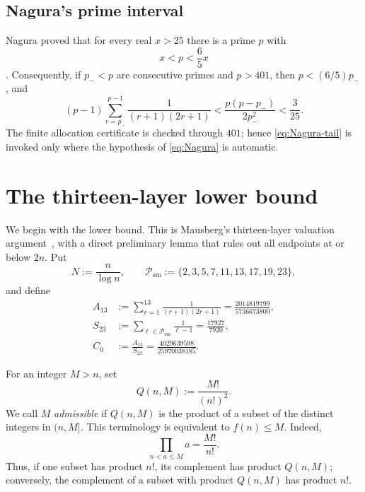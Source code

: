 \documentclass[11pt]{article}
\numberwithin{equation}{section}
\theoremstyle{definition}
\theoremstyle{remark}
\newcommand{\1}{\mathbf 1}
\begin{document}
\subsection{Nagura's prime interval}
\label{subsec:Nagura}

Nagura proved that for every real \(x>25\) there is a prime \(p\) with
\begin{equation}
 \label{eq:Nagura}
                         x<p<\frac65x
\end{equation}
\cite{Nagura1952}.  Consequently, if \(p_-<p\) are consecutive primes and
\(p>401\), then \(p<(6/5)p_-\), and
\begin{equation}
 \label{eq:Nagura-tail}
 (p-1)\sum_{r=p_-}^{p-1}
       \frac1{(r+1)(2r+1)}
 <\frac{p(p-p_-)}{2p_-^2}<\frac3{25}.
\end{equation}
The finite allocation certificate is checked through \(401\); hence
\eqref{eq:Nagura-tail} is invoked only where the hypothesis of
\eqref{eq:Nagura} is automatic.
 \section{The thirteen-layer lower bound}
\label{sec:lower-bound}

We begin with the lower bound.  This is Mausberg's thirteen-layer
valuation argument~\cite{Mausberg2026}, with a direct preliminary lemma
that rules out all endpoints at or below \(2n\).  Put
\[
        N:=\frac{n}{\log n},
        \qquad
        \mathcal P_{\mathrm{sm}}
        :=\{2,3,5,7,11,13,17,19,23\},
\]
and define
\begin{equation}
 \begin{split}
 A_{13}
   &:=\sum_{r=1}^{13}\frac{1}{(r+1)(2r+1)}
     =\frac{2014819799}{5736673800},\\
 S_{23}
   &:=\sum_{\ell\in\mathcal P_{\mathrm{sm}}}
               \frac{1}{\ell-1}
     =\frac{17927}{7920},\\
 C_0&:=\frac{A_{13}}{S_{23}}
     =\frac{4029639598}{25970038185}.
 \end{split}
 \label{eq:lower-constant}
\end{equation}

For an integer \(M>n\), set
\begin{equation}
        Q(n,M):=\frac{M!}{(n!)^2}.
        \label{eq:complement-quotient}
\end{equation}
We call \(M\) \emph{admissible} if \(Q(n,M)\) is the product of a
subset of the distinct integers in \((n,M]\).  This terminology is
equivalent to \(f(n)\le M\).  Indeed,
\[
       \prod_{n<a\le M}a=\frac{M!}{n!}.
\]
Thus, if one subset has product \(n!\), its complement has product
\(Q(n,M)\); conversely, the complement of a subset with product
\(Q(n,M)\) has product \(n!\).
\end{document}
